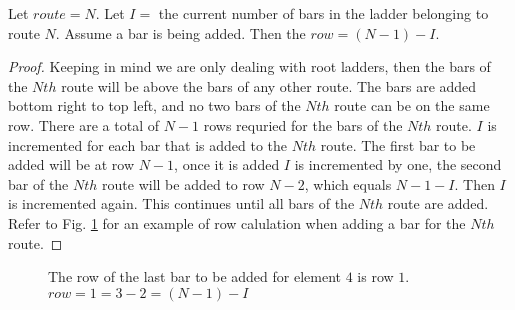 \begin{lemma}
  Let $route=N$. Let $I=$ the current number of bars in the ladder belonging to route $N$. 
  Assume a bar is being added. Then the $row=(N-1)-I$.
\end{lemma}
\begin{proof}
  Keeping in mind we are only dealing with root ladders, then the bars of the $Nth$ route will be above the bars of 
  any other route. The bars are added bottom right to top left, and no two bars of the $Nth$ route can be on the same row.
  There are a total of $N-1$ rows requried for the bars of the $Nth$ route. $I$ is incremented for each bar that is added 
  to the $Nth$ route. The first bar to be added will be at row $N-1$, once it is added $I$ is incremented by one, the second 
  bar of the $Nth$ route will be added to row $N-2$, which equals $N-1-I$. Then $I$ is incremented again. This continues 
  until all bars of the $Nth$ route are added. Refer to Fig. \ref{fig:SJTcase1} for an example of row calulation when adding a bar 
  for the $Nth$ route.
\end{proof}
\begin{figure}[!htp]
  \begin{center}
  \end{center}
  \caption{The row of the last bar to be added for element $4$ is row $1$. $row=1=3-2=(N-1)-I$}
  \label{fig:SJTcase1}
\end{figure}



